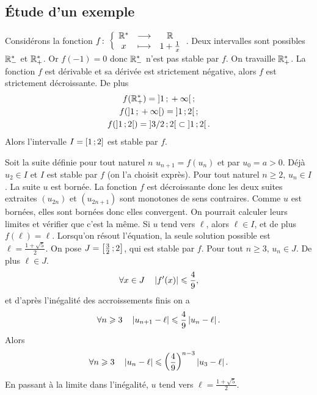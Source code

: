 \subsection{Étude d'un exemple}

Considérons la fonction \(f\colon\left\{\begin{array}{ccc}\mathbb{R}^{*} & \longrightarrow &\mathbb{R}\\x & \longmapsto & 1+\frac{1}{x}\end{array}\right.\). Deux
intervalles sont possibles \(\mathbb{R}_{-}^{*}\) et \(\mathbb{R}_{+}^{*}\). Or \(f(-1)=0\)
donc \(\mathbb{R}_{-}^{*}\) n'est pas stable par \(f\). On travaille
\(\mathbb{R}_{+}^{*}\). La fonction \(f\) est dérivable et sa dérivée est strictement
négative, alors \(f\) est strictement décroissante. De plus
\begin{gather}
  f(\mathbb{R}_{+}^{*})=\left] 1 \, ; {} +\infty \right[; \\
  f(\left] 1 \, ; {} +\infty \right[)=\left] 1 \, ; {} 2 \right[;\\
  f(\left] 1 \, ; {} 2 \right[)=\left] 3/2 \, ; {} 2 \right[ \subset \left] 1 \, ; {} 2 \right[.
\end{gather}
Alors l'intervalle \(I=\left[ 1 \, ; {} 2 \right]\) est stable par \(f\).

Soit la suite définie pour tout naturel \(n\) \(u_{n+1}=f(u_n)\) et par \(u_0 =
a>0\). Déjà \(u_2 \in I\) et \(I\) est stable par \(f\) (on l'a choisit exprès).
Pour tout naturel \(n \geqslant 2\), \(u_n \in I\). La suite \(u\) est bornée.
La fonction \(f\) est décroissante donc les deux suites extraites \((u_{2n})\)
et \((u_{2n+1})\) sont monotones de sens contraires. Comme \(u\) est bornées,
elles sont bornées donc elles convergent. On pourrait calculer leurs limites et
vérifier que c'est la même. Si \(u\) tend vers \(\ell\), alors \(\ell \in I\),
et de plus \(f(\ell)=\ell\). Lorsqu'on résout l'équation, la seule solution
possible est \(\ell=\frac{1+\sqrt{5}}{2}\). On pose
\(J=\left[ \frac{3}{2} \, ; {} 2 \right]\), qui est stable par \(f\). Pour tout \(n
\geqslant 3\), \(u_n \in J\). De plus \(\ell \in J\).
\begin{equation}
  \forall x \in J \quad \left\lvert f'(x)\right\rvert\leqslant \frac{4}{9},
\end{equation}
et d'après l'inégalité des accroissements finis on a
\begin{equation}
  \forall n \geqslant 3 \quad \left\lvert u_{n+1}-\ell\right\rvert  \leqslant \frac{4}{9}
  \left\lvert u_n-\ell\right\rvert.
\end{equation}
Alors
\begin{equation}
  \forall n \geqslant 3 \quad \left\lvert u_n-\ell\right\rvert \leqslant
  \left(\frac{4}{9}\right)^{n-3}\left\lvert u_3-\ell\right\rvert.
\end{equation}
En passant à la limite dans l'inégalité, \(u\) tend vers
\(\ell=\frac{1+\sqrt{5}}{2}\).


